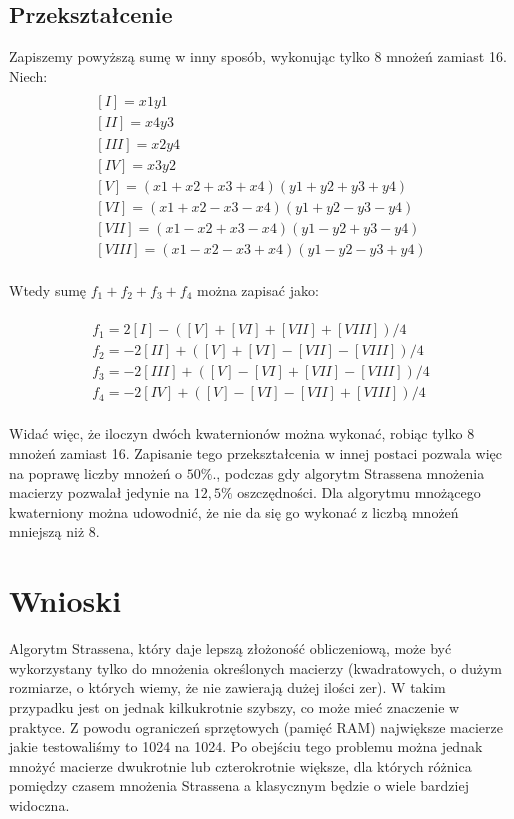 \documentclass[paper=a4, fontsize=11pt]{scrartcl} %
\numberwithin{equation}{section} %
\numberwithin{figure}{section} %
\numberwithin{table}{section} %
\begin{document}
\subsection{Przekształcenie}
Zapiszemy powyższą sumę w inny sposób, wykonując tylko 8 mnożeń zamiast 16. Niech:
\begin{equation}
\begin{gathered}
\\
[I] = x1 y1 \\ 
[II] = x4 y3 \\ 
[III] = x2 y4 \\
[IV] = x3 y2 \\
[V] = (x1+x2+x3+x4)(y1+y2+y3+y4) \\
[VI] = (x1+x2-x3-x4)(y1+y2-y3-y4) \\
[VII] = (x1-x2+x3-x4)(y1-y2+y3-y4) \\
[VIII] = (x1-x2-x3+x4)(y1-y2-y3+y4) \\
\end{gathered}
\end{equation}

Wtedy sumę ${f_1+f_2+f_3+f_4}$ można zapisać jako:

\begin{equation}
\begin{gathered}
\\
f_1 = 2[I] - ([V] + [VI] + [VII] + [VIII])/4 \\ 
f_2 = -2[II] + ([V] + [VI] - [VII] - [VIII])/4 \\ 
f_3 = -2[III] + ([V] - [VI] + [VII] - [VIII])/4 \\
f_4 = -2[IV] + ([V] - [VI] - [VII] + [VIII])/4 \\
\end{gathered}
\end{equation}

Widać więc, że iloczyn dwóch kwaternionów można wykonać, robiąc tylko 8 mnożeń zamiast 16\cite{quaternion}. 
Zapisanie tego przekształcenia w innej postaci pozwala więc na poprawę liczby mnożeń o ${50\%}$., 
podczas gdy algorytm Strassena mnożenia macierzy pozwalał jedynie na ${12,5\%}$ oszczędności.\medbreak
Dla algorytmu mnożącego kwaterniony można udowodnić, że nie da się go wykonać z liczbą mnożeń mniejszą niż 8.\cite{quaternion}

\section{Wnioski}
Algorytm Strassena, który daje lepszą złożoność obliczeniową, może być wykorzystany
tylko do mnożenia określonych macierzy 
(kwadratowych, o dużym rozmiarze, o których wiemy, że nie zawierają dużej ilości zer).
W takim przypadku jest on jednak kilkukrotnie szybszy, co może mieć znaczenie w praktyce.
Z powodu ograniczeń sprzętowych (pamięć RAM) największe macierze jakie testowaliśmy
to 1024 na 1024.
Po obejściu tego problemu można jednak mnożyć macierze dwukrotnie lub czterokrotnie większe, 
dla których różnica pomiędzy czasem mnożenia Strassena a klasycznym będzie o wiele bardziej widoczna.
\end{document}
